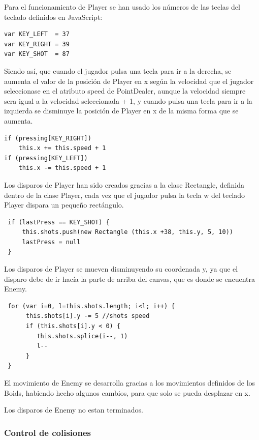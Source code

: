 \documentclass[a4paper,10pt]{article}
\begin{document}
Para el funcionamiento de Player se han usado los números de las teclas del teclado definidos en JavaScript:

\begin{verbatim}
var KEY_LEFT  = 37
var KEY_RIGHT = 39
var KEY_SHOT  = 87
\end{verbatim}

Siendo así, que cuando el jugador pulsa una tecla para ir a la derecha, se aumenta el valor de la posición de Player en x según la velocidad
que el jugador seleccionase en el atributo speed de PointDealer, aunque la velocidad siempre sera igual a la velocidad seleccionada + 1,
y cuando pulsa una tecla para ir a la izquierda se disminuye la posición de Player en x de la misma forma que se aumenta.
 
\begin{verbatim}
if (pressing[KEY_RIGHT])
    this.x += this.speed + 1
if (pressing[KEY_LEFT])
    this.x -= this.speed + 1
\end{verbatim}

Los disparos de Player han sido creados gracias a la clase Rectangle, definida dentro de la clase Player, cada vez que el jugador pulsa la tecla w del teclado 
Player dispara un pequeño rectángulo.

\begin{verbatim}
 if (lastPress == KEY_SHOT) {
     this.shots.push(new Rectangle (this.x +38, this.y, 5, 10)) 
     lastPress = null
 }
\end{verbatim}
\cleardoublepage

Los disparos de Player se mueven disminuyendo su coordenada y, ya que el disparo debe de ir hacía la parte de arriba del
canvas, que es donde se encuentra Enemy.

\begin{verbatim}
 for (var i=0, l=this.shots.length; i<l; i++) {
      this.shots[i].y -= 5 //shots speed  
      if (this.shots[i].y < 0) {
         this.shots.splice(i--, 1)
         l--
      }
 }
\end{verbatim}


El movimiento de Enemy se desarrolla gracias a los movimientos definidos de los Boids, habiendo hecho algunos cambios, 
para que solo se pueda desplazar en x.

Los disparos de Enemy no estan terminados.
\cleardoublepage

\subsubsection{Control de colisiones}
\end{document}

